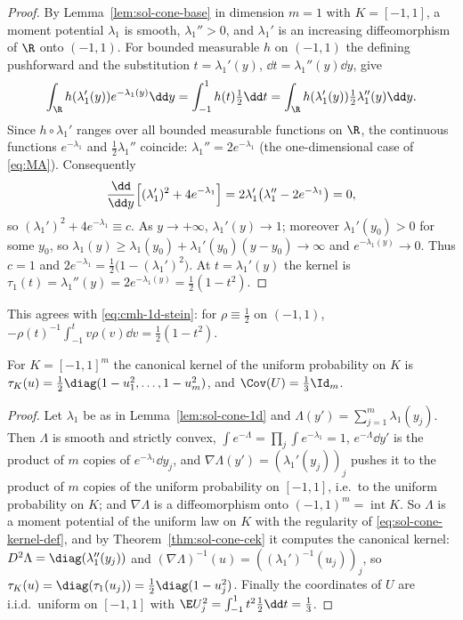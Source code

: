 \documentclass[../main.tex]{subfiles}
\begin{document}
\begin{proof}
By Lemma~\ref{lem:sol-cone-base} in dimension $m=1$ with $K=[-1,1]$, a moment potential
$\lambda_1$ is smooth, $\lambda_1''>0$, and $\lambda_1'$ is an increasing diffeomorphism of $\R$
onto $(-1,1)$.  For bounded measurable $h$ on $(-1,1)$ the defining pushforward and the
substitution $t=\lambda_1'(y)$, $\dd t=\lambda_1''(y)\dd y$, give
\[
  \int_\R h(\lambda_1'(y))e^{-\lambda_1(y)}\dd y=\int_{-1}^1h(t)\tfrac12\dd t
  =\int_\R h(\lambda_1'(y))\tfrac12\lambda_1''(y)\dd y .
\]
Since $h\circ\lambda_1'$ ranges over all bounded measurable functions on $\R$, the continuous
functions $e^{-\lambda_1}$ and $\tfrac12\lambda_1''$ coincide: $\lambda_1''=2e^{-\lambda_1}$
(the one-dimensional case of \eqref{eq:MA}).  Consequently
\[
  \frac{\dd}{\dd y}\Bigl[(\lambda_1')^2+4e^{-\lambda_1}\Bigr]
  =2\lambda_1'\bigl(\lambda_1''-2e^{-\lambda_1}\bigr)=0,
\]
so $(\lambda_1')^2+4e^{-\lambda_1}\equiv c$.  As $y\to+\infty$, $\lambda_1'(y)\to1$; moreover
$\lambda_1'(y_0)>0$ for some $y_0$, so $\lambda_1(y)\ge\lambda_1(y_0)+\lambda_1'(y_0)(y-y_0)\to\infty$
and $e^{-\lambda_1(y)}\to0$.  Thus $c=1$ and $2e^{-\lambda_1}=\tfrac12\bigl(1-(\lambda_1')^2\bigr)$.
At $t=\lambda_1'(y)$ the kernel is $\tau_1(t)=\lambda_1''(y)=2e^{-\lambda_1(y)}=\tfrac12(1-t^2)$.
\end{proof}

This agrees with \eqref{eq:cmh-1d-stein}: for $\rho\equiv\tfrac12$ on $(-1,1)$,
$-\rho(t)^{-1}\int_{-1}^tv\rho(v)\dd v=\tfrac12(1-t^2)$.

\begin{lemma}
\label{lem:sol-cone-product}
For $K=[-1,1]^m$ the canonical kernel of the uniform probability on $K$ is
$\tau_K(u)=\tfrac12\diag(1-u_1^2,\dots,1-u_m^2)$, and $\Cov(U)=\tfrac13\Id_m$.
\end{lemma}

\begin{proof}
Let $\lambda_1$ be as in Lemma~\ref{lem:sol-cone-1d} and $\Lambda(y')=\sum_{j=1}^m\lambda_1(y_j)$.
Then $\Lambda$ is smooth and strictly convex, $\int e^{-\Lambda}=\prod_j\int e^{-\lambda_1}=1$,
$e^{-\Lambda}\dd y'$ is the product of $m$ copies of $e^{-\lambda_1}\dd y_j$, and
$\nabla\Lambda(y')=(\lambda_1'(y_j))_j$ pushes it to the product of $m$ copies of the uniform
probability on $[-1,1]$, i.e.\ to the uniform probability on $K$; and $\nabla\Lambda$ is a
diffeomorphism onto $(-1,1)^m=\operatorname{int}K$.  So $\Lambda$ is a moment potential of
the uniform law on $K$ with the regularity of \eqref{eq:sol-cone-kernel-def}, and by
Theorem~\ref{thm:sol-cone-cek} it computes the canonical kernel:
$D^2\Lambda=\diag(\lambda_1''(y_j))$ and $(\nabla\Lambda)^{-1}(u)=((\lambda_1')^{-1}(u_j))_j$,
so $\tau_K(u)=\diag(\tau_1(u_j))=\tfrac12\diag(1-u_j^2)$.  Finally the coordinates of $U$ are
i.i.d.\ uniform on $[-1,1]$ with $\E U_j^2=\int_{-1}^1t^2\tfrac12\dd t=\tfrac13$.
\end{proof}
\end{document}
